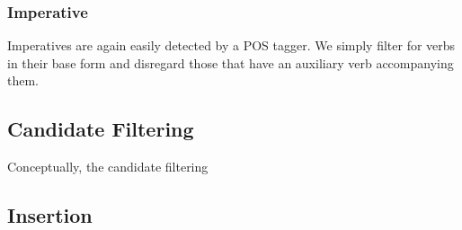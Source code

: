 \documentclass[times, 10pt,twocolumn]{article}
\begin{document}


\subsubsection{Imperative}
Imperatives are again easily detected by a POS tagger. We simply filter for verbs in their base
form and disregard those that have an auxiliary verb accompanying them.





\subsection{Candidate Filtering}
Conceptually, the candidate filtering 




\subsection{Insertion}












\end{document}
